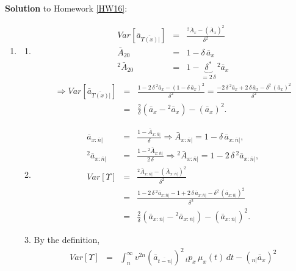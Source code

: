 \documentclass[11pt,fleqn,oneside]{book}
\begin{document}
\noindent \textbf{Solution} to Homework \ref{HW16}:
\footnotesize
\begin{enumerate}
\item
\begin{enumerate}
\item
\begin{eqnarray*}
Var[\bar{a}_{\overline{T(x)}|}]&=& \frac{{^2\bar{A}_{x}} - \left(\bar{A}_{x}\right)^2}{\delta^2} \\
{\bar{A}_{20}} &=& 1 - \delta \, {\bar{a}_{x}}\\
{^2\bar{A}_{20}} &=& 1 - \underbrace{\delta^*}_{=2\,\delta} \, {^2\bar{a}_{x}}
\end{eqnarray*}
\begin{eqnarray*}
\Rightarrow Var[\bar{a}_{\overline{T(x)}|}] &=& \frac{1-2\,\delta\,{^2\bar{a}_{x}} - \left( 1 - \delta \, {\bar{a}_{x}}\right)^2}{\delta^2} =  \frac{-2\,\delta\,{^2\bar{a}_{x}} +2\, \delta \, {\bar{a}_{x}} - \delta^2 \, \left({\bar{a}_{x}}\right)^2}{\delta^2}\\
&=& \frac{2}{\delta} \left({\bar{a}_{x}} - {^2\bar{a}_{x}}\right) - \left({\bar{a}_{x}}\right)^2.
\end{eqnarray*}
\item 
\begin{eqnarray*}
{\bar{a}_{x:\overline{n}|}} &=& \frac{1 - {\bar{A}_{x:\overline{n}|}}}{\delta} \Rightarrow {\bar{A}_{x:\overline{n}|}} = 1 - \delta\,{\bar{a}_{x:\overline{n}|}},\\
{^2\bar{a}_{x:\overline{n}|}} &=& \frac{1 - {^2\bar{A}_{x:\overline{n}|}}}{2\,\delta} \Rightarrow {^2\bar{A}_{x:\overline{n}|}} = 1 - 2\,\delta\,{^2\bar{a}_{x:\overline{n}|}},\\
Var[\Upsilon] &=& \frac{ {^2\bar{A}_{x:\overline{n}|}} - \left( {\bar{A}_{x:\overline{n}|}} \right)^2}{\delta^2}\\
&=& \frac{1 - 2\,\delta\,{^2\bar{a}_{x:\overline{n}|}} - 1 + 2\,\delta\,{\bar{a}_{x:\overline{n}|}} - \delta^2\,\left({\bar{a}_{x:\overline{n}|}}\right)^2}{\delta^2}\\
&=& \frac{2}{\delta} \left({\bar{a}_{x:\overline{n}|}} - {^2\bar{a}_{x:\overline{n}|}}\right) - \left({\bar{a}_{x:\overline{n}|}}\right)^2.
\end{eqnarray*}
\item By the definition,
\begin{eqnarray*}
Var[\Upsilon] &=& \int_n^{\infty} v^{2n} \left({\bar{a}_{\overline{t-n}|}}\right)^2\,{_tp_x}\,\mu_x(t)\,dt 
- \left({_{n|}\bar{a}_{x}}\right)^2\\

\end{eqnarray*}
\end{enumerate}
\end{enumerate}
\end{document}
